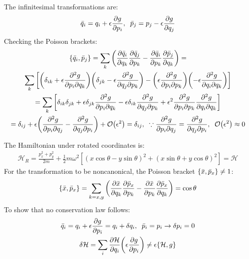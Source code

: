 \documentclass{report}
\theoremstyle{definition}
\begin{document}
\begin{chapter2}\label{prob: 18}
	The infinitesimal transformations are:
		$$ \bar q_i = q_i + \epsilon \pdv{g}{p_i}, \;\; \bar p_j = p_j - \epsilon \pdv{g}{q_j} $$
		Checking the Poisson brackets:
		\begin{gather*}
			\acomm{\bar q_i}{\bar p_j} = \sum_k \pqty{\pdv{\bar q_i}{q_k}\pdv{\bar q_j}{p_k} - \pdv{\bar q_i}{p_k}\pdv{\bar p_j}{q_k}} = \\
			\sum_k \bqty{\pqty{\delta_{ik} + \epsilon\pdv{g}{p_i}{q_k}}\pqty{\delta_{jk}-\epsilon\pdv{g}{q_j}{p_k}} - \pqty{\epsilon\pdv{g}{p_i}{p_k}}\pqty{-\epsilon\pdv{g}{q_i}{q_k}}} \\
			= \sum_k \bqty{\delta_{ik}\delta_{jk} + \epsilon\delta_{jk}\pdv{g}{p_i}{q_k} - \epsilon\delta_{ik}\pdv{g}{q_j}{p_k} + \epsilon^2\pdv{g}{p_i}{p_k}\pdv{g}{q_i}{q_k} } \\
			= \delta_{ij} + \epsilon\pqty{\pdv{g}{p_i}{q_j} - \pdv{g}{q_j}{p_i}} + \order{\epsilon^2} = \delta_{ij}, \;\; \because \pdv{g}{p_i}{q_j} = \pdv{g}{q_j}{p_i},\;\; \order{\epsilon^2} \approx 0
		\end{gather*}

\end{chapter2}

\begin{chapter2}\label{prob: 19}
	The Hamiltonian under rotated coordinates is:
		\begin{gather*}
			\mathcal{H}_R = \frac{p^2_x + p^2_y}{2m} + \frac{1}{2}m\omega^2[(x\cos\theta - y\sin\theta)^2 + (x\sin\theta + y\cos\theta)^2] = \mathcal{H}
		\end{gather*}
		For the transformation to be noncanonical, the Poisson bracket $\qty{\bar x, \bar p_x} \neq 1$:
		\begin{gather*}
			\acomm{\bar x}{\bar p_x} = \sum_{k = x, y} \pqty{\pdv{\bar x}{q_k}\pdv{\bar p_x}{p_k} - \pdv{\bar x}{p_k}\pdv{\bar p_x}{q_k}} = \cos\theta
		\end{gather*}
		To show that no conservation law follows:
		\begin{gather*}
			\bar q_i = q_i + \epsilon\pdv{g}{p_i} = q_i + \delta q_i, \;\; \bar p_i = p_i \rightarrow \delta p_i = 0 \\
			\delta \mathcal{H} = \sum_i \pdv{\mathcal{H}}{q_i}\pqty{\epsilon\pdv{g}{p_i}} \neq \epsilon\acomm{\mathcal{H}}{g}
		\end{gather*}
\end{chapter2}
\end{document}

